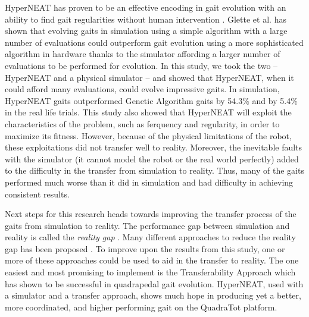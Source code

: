 HyperNEAT has proven to be an effective encoding in gait evolution with an ability to find gait regularities without human intervention \cite{clune1,clune2,yos:clune}. 
Glette et al. \cite{glette} has shown that evolving gaits in simulation using a simple algorithm with a large number of evaluations could outperform gait evolution using a more sophisticated algorithm in hardware thanks to the simulator affording a larger number of evaluations to be performed for evolution. 
In this study, we took the two -- HyperNEAT and a physical simulator -- and showed that HyperNEAT, when it could afford many evaluations, could evolve impressive gaits. 
In simulation, HyperNEAT gaits outperformed Genetic Algorithm gaits \cite{glette} by 54.3\% and by 5.4\% in the real life trials. 
This study also showed that HyperNEAT will exploit the characteristics of the problem, such as ferquency and regularity, in order to maximize its fitness.
However, because of the physical limitations of the robot, these exploitations did not transfer well to reality. %
Moreover, the inevitable faults with the simulator (it cannot model the robot or the real world perfectly) added to the difficulty in the transfer from simulation to reality. 
Thus, many of the gaits performed much worse than it did in simulation and had difficulty in achieving consistent results. 


Next steps for this research heads towards improving the transfer process of the gaits from simulation to reality. 
The performance gap between simulation and reality is called the \emph{reality gap} \cite{jakobi}. 
Many different approaches to reduce the reality gap has been proposed \cite{koos1,bongard,zagal}. 
To improve upon the results from this study, one or more of these approaches could be used to aid in the transfer to reality. 
The one easiest and most promising to implement is the Transferability Approach \cite{koos2} which has shown to be successful in quadrapedal gait evolution. 
HyperNEAT, used with a simulator and a transfer approach, shows much hope in producing yet a better, more coordinated, and higher performing gait on the QuadraTot platform. 
